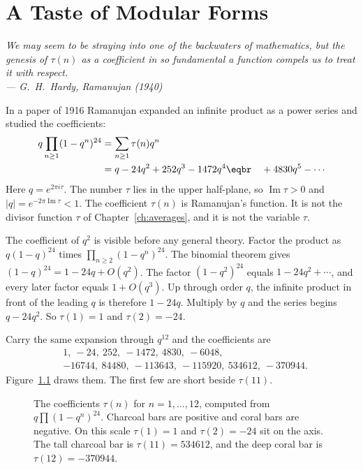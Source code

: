 \chapter{A Taste of Modular Forms}\label{ch:modular}

\begin{center}\itshape
We may seem to be straying into one of the backwaters of mathematics, but the genesis of $\tau(n)$ as a coefficient in so fundamental a function compels us to treat it with respect.\\
\upshape --- G.~H.~Hardy, \emph{Ramanujan} (1940)
\end{center}

In a paper of 1916 Ramanujan expanded an infinite product as a power series and studied the coefficients:
\[
\begin{aligned}q\prod_{n\ge1}(1-q^n)^{24}&=\sum_{n\ge1}\tau(n)q^n\\&=q-24q^2+252q^3-1472q^4\eqbr\quad+4830q^5-\cdots\end{aligned}
\]
Here $q=e^{2\pi i\tau}$. The number $\tau$ lies in the upper half-plane, so $\operatorname{Im}\tau>0$ and $|q|=e^{-2\pi\operatorname{Im}\tau}<1$. The coefficient $\tau(n)$ is Ramanujan's function. It is not the divisor function $\tau$ of Chapter~\ref{ch:averages}, and it is not the variable $\tau$.

The coefficient of $q^2$ is visible before any general theory. Factor the product as $q(1-q)^{24}$ times $\prod_{n\ge2}(1-q^n)^{24}$. The binomial theorem gives $(1-q)^{24}=1-24q+O(q^2)$. The factor $(1-q^2)^{24}$ equals $1-24q^2+\cdots$, and every later factor equals $1+O(q^3)$. Up through order $q$, the infinite product in front of the leading $q$ is therefore $1-24q$. Multiply by $q$ and the series begins $q-24q^2$. So $\tau(1)=1$ and $\tau(2)=-24$.


Carry the same expansion through $q^{12}$ and the coefficients are
\[
\begin{aligned}
&1,\ -24,\ 252,\ -1472,\ 4830,\ -6048,\\
&-16744,\ 84480,\ -113643,\ -115920,\ 534612,\ -370944.
\end{aligned}
\]
Figure~\ref{fig:newtau} draws them. The first few are short beside $\tau(11)$.

\begin{figure}[ht]
\centering
{}
\caption{The coefficients $\tau(n)$ for $n=1,\ldots,12$, computed from $q\prod(1-q^n)^{24}$. Charcoal bars are positive and coral bars are negative. On this scale $\tau(1)=1$ and $\tau(2)=-24$ sit on the axis. The tall charcoal bar is $\tau(11)=534612$, and the deep coral bar is $\tau(12)=-370944$.}
\label{fig:newtau}
\end{figure}

